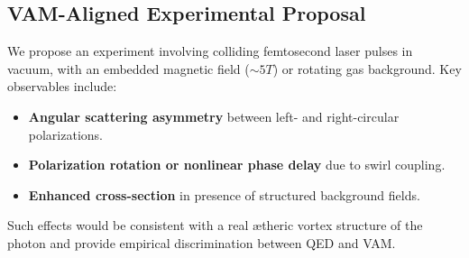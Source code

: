         \subsection{VAM-Aligned Experimental Proposal}

                We propose an experiment involving colliding femtosecond laser pulses in vacuum, with an embedded magnetic field ($\sim5T$) or rotating gas background. Key observables include:

                \begin{itemize}
                    \item \textbf{Angular scattering asymmetry} between left- and right-circular polarizations.
                    \item \textbf{Polarization rotation or nonlinear phase delay} due to swirl coupling.
                    \item \textbf{Enhanced cross-section} in presence of structured background fields.
                \end{itemize}

                Such effects would be consistent with a real ætheric vortex structure of the photon and provide empirical discrimination between QED and VAM.